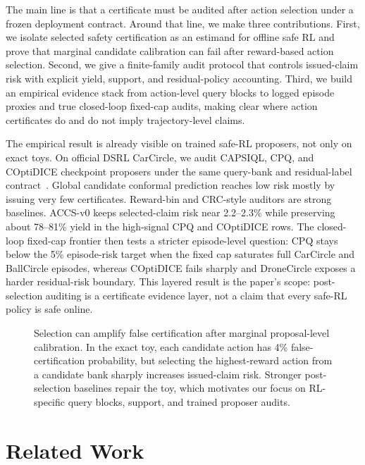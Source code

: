 \documentclass[letterpaper]{article}
\begin{document}
The main line is that a certificate must be audited after action selection
under a frozen deployment contract. Around that line, we make three
contributions. First, we isolate selected safety certification as an estimand
for offline safe RL and prove that marginal candidate calibration can fail
after reward-based action selection. Second, we give a finite-family audit
protocol that controls issued-claim risk with explicit yield, support, and
residual-policy accounting. Third, we build an empirical evidence stack from
action-level query blocks to logged episode proxies and true closed-loop
fixed-cap audits, making clear where action certificates do and do not imply
trajectory-level claims.

The empirical result is already visible on trained safe-RL proposers, not only
on exact toys. On official DSRL CarCircle, we audit CAPSIQL, CPQ, and COptiDICE
checkpoint proposers under the same query-bank and residual-label
contract~\cite{liu2023dsrl,li2025caps}. Global candidate conformal prediction
reaches low risk mostly by issuing very few certificates. Reward-bin and
CRC-style auditors are strong baselines. ACCS-v0 keeps selected-claim risk near
2.2--2.3\% while preserving about 78--81\% yield in the high-signal CPQ and
COptiDICE rows. The closed-loop fixed-cap frontier then tests a stricter
episode-level question: CPQ stays below the 5\% episode-risk target when the
fixed cap saturates full CarCircle and BallCircle episodes, whereas COptiDICE
fails sharply and DroneCircle exposes a harder residual-risk boundary. This
layered result is the paper's scope: post-selection auditing is a certificate
evidence layer, not a claim that every safe-RL policy is safe online.

\begin{figure}[t]
\centering
\FigureSelectionAmplificationTikZ
\caption{Selection can amplify false certification after marginal proposal-level calibration. In the exact toy, each candidate action has 4\% false-certification probability, but selecting the highest-reward action from a candidate bank sharply increases issued-claim risk. Stronger post-selection baselines repair the toy, which motivates our focus on RL-specific query blocks, support, and trained proposer audits.}
\label{fig:selection-amplification}
\end{figure}

\section{Related Work}
\end{document}
